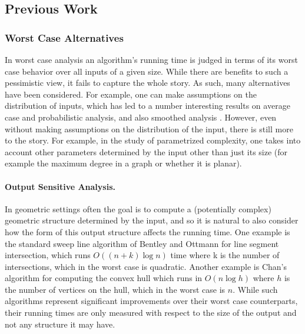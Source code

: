 \documentclass[11pt]{article}
\theoremstyle{definition}
\begin{document}
% 

\subsection{Previous Work}

\subsubsection{Worst Case Alternatives}
In worst case analysis an algorithm's running time is judged in terms of its worst 
case behavior over all inputs of a given size.  While there are benefits to such a 
pessimistic view, it fails to capture the whole story.  As such, many alternatives 
have been considered.  For example, one can make assumptions on the distribution of 
inputs, which has led to a number interesting results on average case and probabilistic 
analysis, and also smoothed analysis \cite{st-saa-04}.  However, even without making 
assumptions on the distribution of the input, there is still more to the story.
For example, in the study of parametrized complexity, one takes into account other 
parameters determined by the input other than just its size (for example the maximum 
degree in a graph or whether it is planar).

\paragraph{Output Sensitive Analysis.}
In geometric settings often the goal is to compute a (potentially complex) geometric structure determined 
by the input, and so it is natural to also consider how the form of this output structure affects the running time.
One example is the standard sweep line algorithm of Bentley and Ottmann \cite{bo-arcgi-79} for line segment intersection, 
which runs $O((n+k)\log n)$ time where k is the number of intersections, which in the worst case is quadratic.
Another example is Chan's algorithm for computing the convex hull \cite{c-ooscha-96} which runs in $O(n\log h)$ 
where $h$ is the number of vertices on the hull, which in the worst case is $n$.  While such algorithms represent 
significant improvements over their worst case counterparts, their running times are only measured with respect 
to the size of the output and not any structure it may have.
\end{document}
